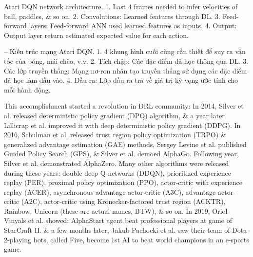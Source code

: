\documentclass{article}
\begin{document}
\begin{itemize}
\begin{itemize}
\begin{itemize}
\begin{itemize}
                {\sf Atari DQN network architecture.} 1. Last 4 frames needed to infer velocities of ball, paddles, \& so on. 2. Convolutions: Learned features through DL. 3. Feed-forward layers: Feed-forward ANN used learned features as inputs. 4. Output: Output layer return estimated expected value for each action.

                -- {\sf Kiến trúc mạng Atari DQN.} 1. 4 khung hình cuối cùng cần thiết để suy ra vận tốc của bóng, mái chèo, v.v. 2. Tích chập: Các đặc điểm đã học thông qua DL. 3. Các lớp truyền thẳng: Mạng nơ-ron nhân tạo truyền thẳng sử dụng các đặc điểm đã học làm đầu vào. 4. Đầu ra: Lớp đầu ra trả về giá trị kỳ vọng ước tính cho mỗi hành động.

                This accomplishment started a revolution in DRL community: In 2014, Silver et al. released deterministic policy gradient (DPQ) algorithm, \& a year later Lillicrap et al. improved it with deep deterministic policy gradient (DDPG). In 2016, Schulman et al. released trust region policy optimization (TRPO) \& generalized advantage estimation (GAE) methods, Sergey Levine et al. published Guided Policy Search (GPS), \& Silver et al. demoed AlphaGo. Following year, Silver et al. demonstrated AlphaZero. Many other algorithms were released during these years: double deep Q-networks (DDQN), prioritized experience replay (PER), proximal policy optimization (PPO), actor-critic with experience replay (ACER), asynchronous advantage actor-critic (A3C), advantage actor-critic (A2C), actor-critic using Kronecker-factored trust region (ACKTR), Rainbow, Unicorn (these are actual names, BTW), \& so on. In 2019, Oriol Vinyals et al. showed: AlphaStart agent beat professional players at game of StarCraft II. \& a few months later, Jakub Pachocki et al. saw their team of Dota-2-playing bots, called Five, become 1st AI to beat world champions in an e-sports game.


\end{itemize}
\end{itemize}
\end{itemize}
\end{itemize}
\end{document}
